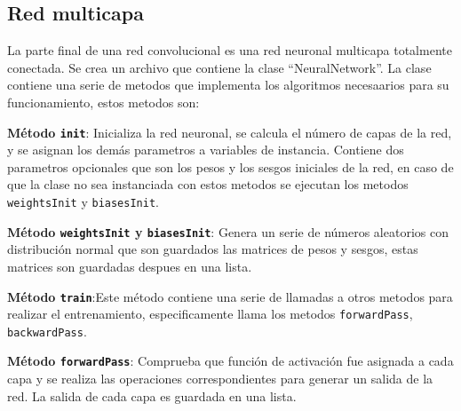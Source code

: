 \documentclass{article}
\begin{document}
\subsection{Red multicapa}
La parte final de una red convolucional es una red neuronal multicapa totalmente conectada. Se crea un archivo que contiene la clase ``NeuralNetwork''. 
La clase contiene una serie de metodos que implementa los algoritmos necesaarios para su funcionamiento, estos metodos son:

\textbf{Método \texttt{init}}: Inicializa la red neuronal, se calcula el número de capas de la red, y se asignan los demás parametros a variables de instancia.
Contiene dos parametros opcionales que son los pesos y los sesgos iniciales de la red, en caso de que la clase no sea instanciada con estos metodos se ejecutan los metodos \texttt{weightsInit} y \texttt{biasesInit}. 

\textbf{Método \texttt{weightsInit} y \texttt{biasesInit}}: Genera un serie de números aleatorios  con distribución normal que son guardados las matrices de pesos y sesgos, estas matrices son guardadas despues en una lista.

\textbf{Método \texttt{train}}:Este método contiene una serie de llamadas a otros metodos para realizar el entrenamiento, especificamente llama los metodos \texttt{forwardPass}, \texttt{backwardPass}.

\textbf{Método \texttt{forwardPass}}: Comprueba que función de activación fue asignada a cada capa y se realiza las operaciones correspondientes para generar un salida de la red. La salida de cada capa es guardada en una lista.
\end{document}
